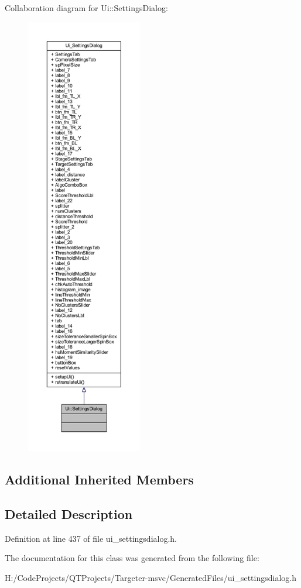 Collaboration diagram for Ui\+:\+:Settings\+Dialog\+:
\nopagebreak
\begin{figure}[H]
\begin{center}
\leavevmode
\includegraphics[height=550pt]{class_ui_1_1_settings_dialog__coll__graph}
\end{center}
\end{figure}
\subsection*{Additional Inherited Members}


\subsection{Detailed Description}


Definition at line 437 of file ui\+\_\+settingsdialog.\+h.



The documentation for this class was generated from the following file\+:\begin{DoxyCompactItemize}
\item 
H\+:/\+Code\+Projects/\+Q\+T\+Projects/\+Targeter-\/msvc/\+Generated\+Files/ui\+\_\+settingsdialog.\+h\end{DoxyCompactItemize}
